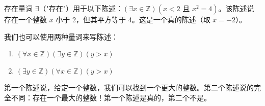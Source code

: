 \documentclass[11pt]{article}
\begin{document}
存在量词 $\exists$（"存在"）用于以下陈述：$(\exists x \in \mathbb{Z})(x < 2 \text{ 且 } x^2 = 4)$。该陈述说存在一个整数 $x$ 小于 2，但其平方等于 4。这是一个真的陈述（取 $x = -2$）。

我们也可以使用两种量词来写陈述：
\begin{enumerate}
\item $(\forall x \in \mathbb{Z})(\exists y \in \mathbb{Z})(y > x)$
\item $(\exists y \in \mathbb{Z})(\forall x \in \mathbb{Z})(y > x)$
\end{enumerate}

第一个陈述说，给定一个整数，我们可以找到一个更大的整数。第二个陈述说的完全不同：存在一个最大的整数！第一个陈述是真的，第二个不是。
\end{document}
